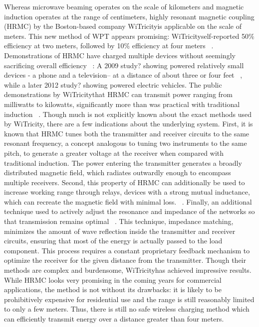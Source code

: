Whereas microwave beaming operates on the scale of kilometers and magnetic induction operates at the range of centimeters, highly resonant magnetic coupling (HRMC) by the Boston-based company WiTricity\textregistered is applicable on the scale of meters. This new method of WPT appears promising: WiTricity\textregistered  self-reported 50\% efficiency at two meters, followed by 10\% efficiency at four meters ~\cite{kesler_highly_2013,tucker_contribution_2013}. Demonstrations of HRMC have charged multiple devices without seemingly sacrificing overall efficiency ~\cite{kesler_highly_2013}: A 2009 study? showing powered relatively small devices - a phone and a television– at a distance of about three or four feet ~\cite{giler_demo_2009}, while a later 2012 study? showing powered electric vehicles. The public demonstrations by WiTricity\textregistered that HRMC can transmit power ranging from milliwatts to kilowatts, significantly more than was practical with traditional induction ~\cite{kesler_highly_2013}.
Though much is not explicitly known about the exact methods used by WiTricity\textregistered, there are a few indications about the underlying system. First, it is known that HRMC tunes both the transmitter and receiver circuits to the same resonant frequency, a concept analogous to tuning two instruments to the same pitch, to generate a greater voltage at the receiver when compared with traditional induction. The power entering the transmitter generates a broadly distributed magnetic field, which radiates outwardly enough to encompass multiple receivers. Second, this property of HRMC can additionally be used to increase working range through relays, devices with a strong mutual inductance, which can recreate the magnetic field with minimal loss. ~\cite{butler_tour_2013}. Finally, an additional technique used to actively adjust the resonance and impedance of the networks so that transmission remains optimal ~\cite{kesler_highly_2013}. This technique, impedance matching, minimizes the amount of wave reflection inside the transmitter and receiver circuits, ensuring that most of the energy is actually passed to the load component. This process requires a constant proprietary feedback mechanism to optimize the receiver for the given distance from the transmitter.
Though their methods are complex and burdensome, WiTricity\textregistered has achieved impressive results. While HRMC looks very promising in the coming years for commercial applications, the method is not without its drawbacks: it is likely to be prohibitively expensive for residential use and the range is still reasonably limited to only a few meters. Thus, there is still no safe wireless charging method which can efficiently transmit energy over a distance greater than four meters.


